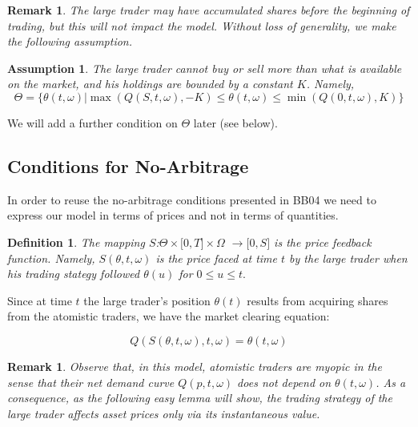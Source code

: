 \documentclass{article}
\newtheorem{definition}[theorem]{Definition}
\newtheorem{remark}[theorem]{Remark}
\newtheorem{assumption}[theorem]{Assumption}
\begin{document}
\begin{remark}
The large trader may have accumulated shares before the
beginning of trading, but this will not impact the model. Without loss of
generality, we make the following assumption.
\end{remark}




\begin{assumption}
The large trader cannot buy or sell more than what is
available on the market, and his holdings are bounded by a constant $K$.
Namely,%
\begin{equation*}
\Theta =\{\theta (t,\omega )|\max (Q(S,t,\omega ),-K)\leq \theta (t,\omega
)\leq \min (Q(0,t,\omega ),K)\}
\end{equation*}
\end{assumption}

We will add a further condition on $\Theta $ later (see below).

\bigskip

\subsection{Conditions for No-Arbitrage}

In order to reuse the no-arbitrage conditions presented in BB04 we need to
express our model in terms of prices and not in terms of quantities.

\bigskip

\begin{definition}
The mapping $S$:$\Theta \times \lbrack 0,T]\times \Omega
$ $\rightarrow \lbrack 0,S]$ is the price feedback function. Namely, $%
S(\theta ,t,\omega )$ is the price faced at time $t$ by the large trader
when his trading stategy followed $\theta (u)$ for $0\leq u\leq t.$
\end{definition}


Since at time $t$ the large trader's position $\theta (t)$ results from
acquiring shares from the atomistic traders, we have the market clearing
equation:

\begin{equation}
Q(S(\theta ,t,\omega ),t,\omega )=\theta (t,\omega )  \label{market_clearing}
\end{equation}


\begin{remark}
Observe that, in this model, atomistic traders are myopic
in the sense that their net demand curve $Q(p,t,\omega )$ does not depend on
$\theta (t,\omega )$. As a consequence, as the following easy lemma will
show, the trading strategy of the large trader affects asset prices only via
its instantaneous value.
\end{remark}
\end{document}
